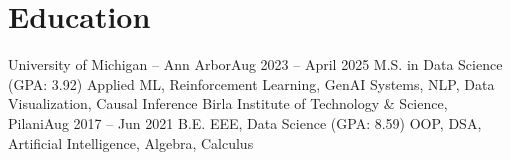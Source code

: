 

\section{Education}
\vspace{-10pt}
\resumeSubheadingEducation
  {University of Michigan – Ann Arbor}{Aug 2023 -- April 2025}
  {M.S. in Data Science (GPA: 3.92)}
  {Applied ML, Reinforcement Learning, GenAI Systems, NLP, Data Visualization, Causal Inference}
\vspace{2pt}
\resumeSubheadingEducation
  {Birla Institute of Technology \& Science, Pilani}{Aug 2017 -- Jun 2021}
  {B.E. EEE, Data Science (GPA: 8.59)}
  {OOP, DSA, Artificial Intelligence, Algebra, Calculus}
